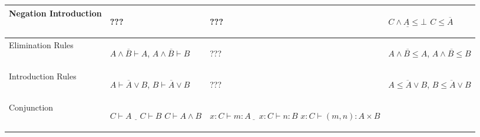 \begin{tabular}{| p{2cm} | p{3cm} | p{4.5cm} | p{3cm} |}
Negation Introduction
  & \begin{center} ??? \end{center}
  & \begin{center} ??? \end{center}
  & \begin{center}
      $\underline{C \wedge A \leq \bot}$\newline
      $C \leq \overline{A}$
    \end{center} \\ \hline
Elimination Rules
  & \begin{center}
      $\overline{A \wedge B \vdash A}$,\newline\newline
      $\overline{A \wedge B \vdash B}$
    \end{center}
  & \begin{center} ??? \end{center}
  & \begin{center}
      $\overline{A \wedge B \leq A}$,\newline\newline
      $\overline{A \wedge B \leq B}$
    \end{center} \\ \hline
Introduction Rules
  & \begin{center}
      $\overline{A \vdash A \vee B}$,\newline\newline
      $\overline{B \vdash A \vee B}$
    \end{center}
  & \begin{center} ??? \end{center}
  & \begin{center}
      $\overline{A \leq A \vee B}$,\newline\newline
      $\overline{B \leq A \vee B}$
    \end{center} \\ \hline
Conjunction
  & \begin{center}
    $\underline{C \vdash A \quad C \vdash B}$\newline
    $C \vdash A \wedge B$
    \end{center}
  & \begin{center}
    $\underline{x:C \vdash m:A \quad x:C \vdash n:B}$\newline
    $x:C \vdash (m,n):A \times B$
    \end{center}
  & \begin{center}

\end{center}
\end{tabular}
